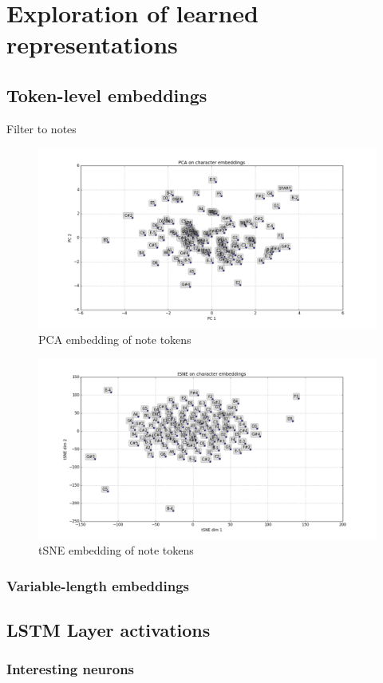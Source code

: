 \documentclass[dissertation.tex]{subfiles}
\begin{document}
\chapter{Exploration of learned representations}

\section{Token-level embeddings}

Filter to notes

\begin{figure}[htpb]
    \centering
    \includegraphics[width=0.8\linewidth]{Figures/PCA-notes.png}
    \caption{PCA embedding of note tokens}
    \label{fig:pca-notes}
\end{figure}

\begin{figure}[htpb]
    \centering
    \includegraphics[width=0.8\linewidth]{Figures/tSNE-notes.png}
    \caption{tSNE embedding of note tokens}
    \label{fig:tsne-notes}
\end{figure}

\subsection{Variable-length embeddings}


\section{LSTM Layer activations}


\subsection{Interesting neurons}


\printbibliography
\end{document}
